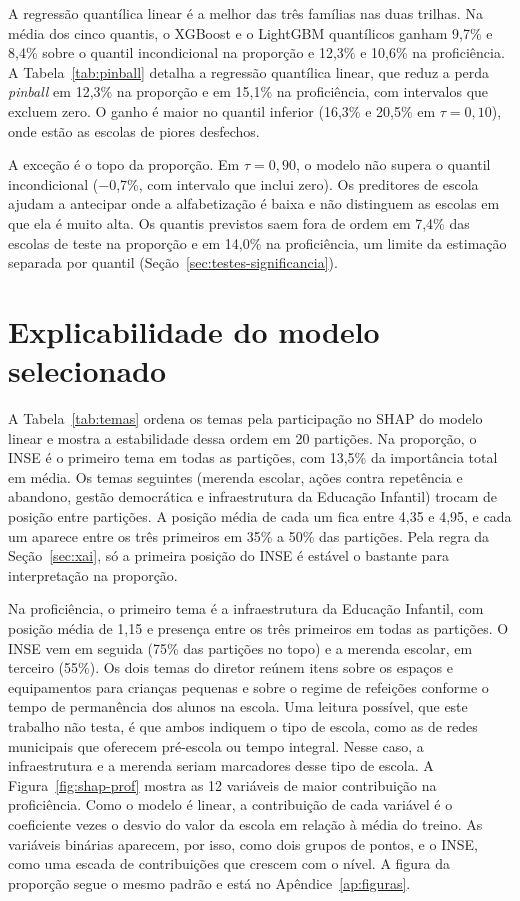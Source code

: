 A regressão quantílica linear é a melhor das três famílias nas duas
trilhas. Na média dos cinco quantis, o XGBoost e o LightGBM quantílicos
ganham 9,7\% e 8,4\% sobre o quantil incondicional na proporção e 12,3\% e
10,6\% na proficiência. A Tabela~\ref{tab:pinball} detalha a regressão
quantílica linear, que reduz a perda \textit{pinball} em 12,3\% na
proporção e em 15,1\% na proficiência, com intervalos que excluem zero. O
ganho é maior no quantil inferior (16,3\% e 20,5\% em $\tau = 0{,}10$),
onde estão as escolas de piores desfechos.



A exceção é o topo da proporção. Em $\tau = 0{,}90$, o modelo não supera o
quantil incondicional ($-$0,7\%, com intervalo que inclui zero). Os
preditores de escola ajudam a antecipar onde a alfabetização é baixa e
não distinguem as escolas em que ela é muito alta. Os quantis previstos
saem fora de ordem em 7,4\% das escolas de teste na proporção e em 14,0\%
na proficiência, um limite da estimação separada por quantil
(Seção~\ref{sec:testes-significancia}).

\section{Explicabilidade do modelo selecionado}
\label{sec:res-xai}

A Tabela~\ref{tab:temas} ordena os temas pela participação no SHAP do
modelo linear e mostra a estabilidade dessa ordem em 20 partições. Na
proporção, o INSE é o primeiro tema em todas as partições, com 13,5\% da
importância total em média. Os temas seguintes (merenda escolar, ações
contra repetência e abandono, gestão democrática e infraestrutura da
Educação Infantil) trocam de posição entre partições. A posição média de
cada um fica entre 4,35 e 4,95, e cada um aparece entre os três primeiros em
35\% a 50\% das partições. Pela regra da Seção~\ref{sec:xai}, só a primeira
posição do INSE é estável o bastante para interpretação na proporção.



Na proficiência, o primeiro tema é a infraestrutura da Educação Infantil,
com posição média de 1,15 e presença entre os três primeiros em todas as
partições. O INSE vem em seguida (75\% das partições no topo) e a merenda
escolar, em terceiro (55\%). Os dois temas do diretor reúnem itens sobre
os espaços e equipamentos para crianças pequenas e sobre o regime de
refeições conforme o tempo de permanência dos alunos na escola. Uma leitura possível, que este
trabalho não testa, é que ambos indiquem o tipo de escola, como as de
redes municipais que oferecem pré-escola ou tempo integral. Nesse caso, a
infraestrutura e a merenda seriam marcadores desse tipo de escola. A Figura~\ref{fig:shap-prof} mostra as
12 variáveis de maior contribuição na proficiência. Como o modelo é linear,
a contribuição de cada variável é o coeficiente vezes o desvio do valor da
escola em relação à média do treino. As variáveis binárias aparecem, por
isso, como dois grupos de pontos, e o INSE, como uma escada de contribuições
que crescem com o nível. A figura da proporção segue o mesmo padrão e está
no Apêndice~\ref{ap:figuras}.

